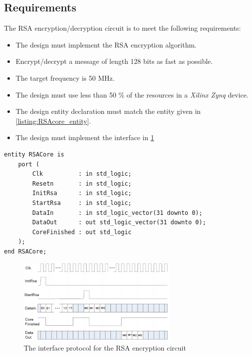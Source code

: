 \subsection{Requirements}
%
The RSA encryption/decryption circuit is to meet the following requirements:
%
\begin{itemize}
    \item The design must implement the RSA encryption algorithm.
    \item Encrypt/decrypt a message of length 128 bits as fast as possible.
    \item The target frequency is 50 MHz.
    \item The design must use less than 50 \% of the resources in a
        \emph{Xilinx Zynq} device.
    \item The design entity declaration must match the entity given in \cref{listing:RSAcore_entity}.
    \item The design must implement the interface in \cref{fig:interface_protocol}
\end{itemize}
%
\begin{lstlisting}[caption=Entity declaration, label=listing:RSAcore_entity]
entity RSACore is
    port (
        Clk          : in std_logic;
        Resetn       : in std_logic;
        InitRsa      : in std_logic;
        StartRsa     : in std_logic;
        DataIn       : in std_logic_vector(31 downto 0);
        DataOut      : out std_logic_vector(31 downto 0);
        CoreFinished : out std_logic
    );
end RSACore;
\end{lstlisting}
%
\begin{figure}[htp]
    \centering
    \includegraphics[width=0.7\textwidth]{images/interface_protocol}
    \caption{The interface protocol for the RSA encryption circuit}
    \label{fig:interface_protocol}
\end{figure}
%
%


